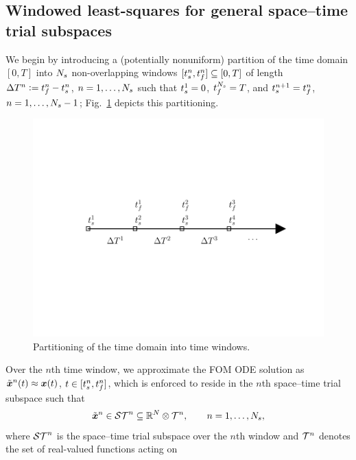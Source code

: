 \subsection{Windowed least-squares for general space--time trial subspaces} 
We begin by introducing a (potentially nonuniform) partition of the time domain $[0,T]$
into $N_s$ non-overlapping windows $[t_s^{n} ,
t_f^{n}]\subseteq[0,T]$ of length $\Delta T^{n}\vcentcolon=t_f^{n} -
t_s^{n}$, $n=1,\ldots,N_s$ such that 
$t_s^{1} = 0$, $t_f^{N_s} = T$, and
$t_s^{n+1} = t_f^{n}$,
$n=1,\ldots,N_s-1$; Fig.~\ref{fig:slab_fig} depicts this partitioning.
\begin{figure} 
\begin{centering} 
\includegraphics[trim={0.0cm 5cm 0cm 3cm},clip,width=1.0\textwidth]{figs/time_grid.pdf} 
\caption{Partitioning of the time
domain into time windows.} 
\label{fig:slab_fig} 
\end{centering} 
\end{figure}
Over the $n$th time window, we approximate the FOM ODE solution as 
$\tilde{\boldsymbol x}^n(t)\approx {\boldsymbol x}(t)$,
$t\in[t_s^{n},t_f^{n}]$, which is enforced to reside in 
the $n$th space--time trial subspace such that
\begin{equation}
\tilde{\boldsymbol x}^n \in \mathcal{ ST }^n \subseteq \mathbb{R}^{N} \otimes \mathcal{T}^{n} , \qquad  n = 1,\ldots,N_s,
\end{equation}
where $\mathcal{ ST }^{n}$ is the space--time trial subspace over the $n$th window and $\mathcal{T}^{n}$ denotes the set of real-valued functions acting on
